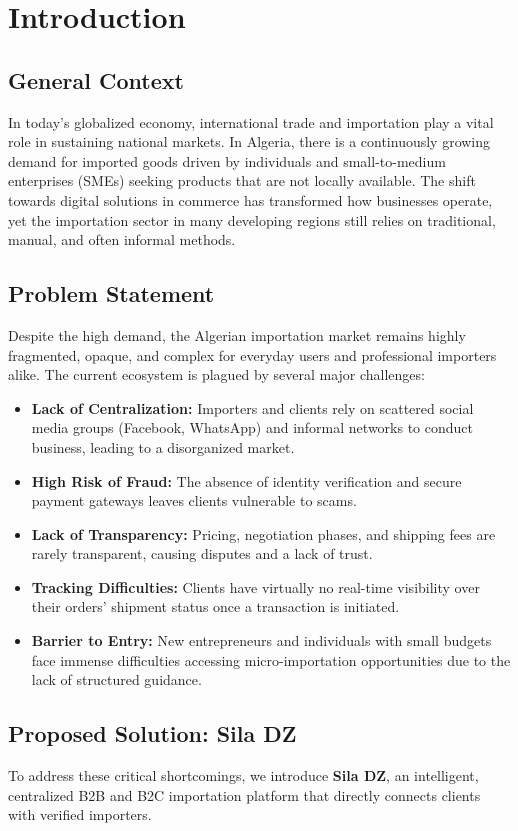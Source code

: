 \chapter{Introduction}

\section{General Context}
In today's globalized economy, international trade and importation play a vital role in sustaining national markets. In Algeria, there is a continuously growing demand for imported goods driven by individuals and small-to-medium enterprises (SMEs) seeking products that are not locally available. The shift towards digital solutions in commerce has transformed how businesses operate, yet the importation sector in many developing regions still relies on traditional, manual, and often informal methods.

\section{Problem Statement}
Despite the high demand, the Algerian importation market remains highly fragmented, opaque, and complex for everyday users and professional importers alike. The current ecosystem is plagued by several major challenges:
\begin{itemize}
    \item \textbf{Lack of Centralization:} Importers and clients rely on scattered social media groups (Facebook, WhatsApp) and informal networks to conduct business, leading to a disorganized market.
    \item \textbf{High Risk of Fraud:} The absence of identity verification and secure payment gateways leaves clients vulnerable to scams.
    \item \textbf{Lack of Transparency:} Pricing, negotiation phases, and shipping fees are rarely transparent, causing disputes and a lack of trust.
    \item \textbf{Tracking Difficulties:} Clients have virtually no real-time visibility over their orders' shipment status once a transaction is initiated.
    \item \textbf{Barrier to Entry:} New entrepreneurs and individuals with small budgets face immense difficulties accessing micro-importation opportunities due to the lack of structured guidance.
\end{itemize}

\section{Proposed Solution: Sila DZ}
To address these critical shortcomings, we introduce \textbf{Sila DZ}, an intelligent, centralized B2B and B2C importation platform that directly connects clients with verified importers. 

